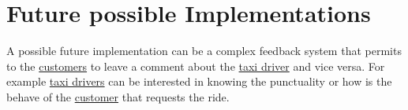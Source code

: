 	\section{Future possible Implementations}
	A possible future implementation can be a complex feedback system that permits to the \hyperref[sec:customer]{customers} to leave a comment about the \hyperref[sec:tdriver]{taxi driver} and vice versa.
	For example \hyperref[sec:tdriver]{taxi drivers} can be interested in knowing the punctuality or how is the behave of the \hyperref[sec:customer]{customer} that requests the ride.